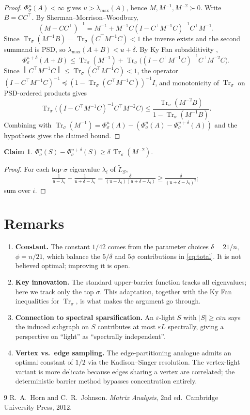 \documentclass[11pt]{article}
\newcommand{\eps}{\varepsilon}
\newcommand{\Trs}{\operatorname{Tr}_{\sigma}}
\newcommand{\opnorm}[1]{\left\lVert #1 \right\rVert}
\newcommand{\del}{\delta}
\newcommand{\tL}{\widetilde{L}}
\newtheorem{claim}[theorem]{Claim}
\begin{document}
\begin{proof}
$\Phi^u_\sigma(A)<\infty$ gives $u>\lambda_{\max}(A)$, hence
$M,M^{-1},M^{-2}\succ 0$. Write $B=CC^{\!\top}$. By Sherman--Morrison--Woodbury,
\[
  (M-CC^{\!\top})^{-1}
   = M^{-1} + M^{-1}C(I-C^{\!\top}M^{-1}C)^{-1}C^{\!\top}M^{-1}.
\]
Since $\Trs(M^{-1}B)=\Trs(C^{\!\top}M^{-1}C)<1$ the inverse exists and the
second summand is PSD, so $\lambda_{\max}(A+B)<u+\del$. By Ky Fan
subadditivity \cite[Thm.~4.3.47a]{HJ12},
\[
  \Phi^{u+\del}_\sigma(A+B)
   \le \Trs(M^{-1})
       + \Trs\!\bigl((I-C^{\!\top}M^{-1}C)^{-1}C^{\!\top}M^{-2}C\bigr).
\]
Since $\opnorm{C^{\!\top}M^{-1}C}\le\Trs(C^{\!\top}M^{-1}C)<1$, the operator
$(I-C^{\!\top}M^{-1}C)^{-1}\preceq(1-\Trs(C^{\!\top}M^{-1}C))^{-1}I$, and
monotonicity of $\Trs$ on PSD-ordered products gives
\[
  \Trs\!\bigl((I-C^{\!\top}M^{-1}C)^{-1}C^{\!\top}M^{-2}C\bigr)
   \le \frac{\Trs(M^{-2}B)}{1-\Trs(M^{-1}B)}.
\]
Combining with
$\Trs(M^{-1})=\Phi^u_\sigma(A)-(\Phi^u_\sigma(A)-\Phi^{u+\del}_\sigma(A))$
and the hypothesis gives the claimed bound.
\end{proof}

\begin{claim}\label{cl:phi-diff}
$\Phi^u_\sigma(S)-\Phi^{u+\del}_\sigma(S)\ge\del\,\Trs(M^{-2})$.
\end{claim}
\begin{proof}
For each top-$\sigma$ eigenvalue $\lambda_i$ of $\tL_S$,
\[
  \tfrac{1}{u-\lambda_i}-\tfrac{1}{u+\del-\lambda_i}
   = \tfrac{\del}{(u-\lambda_i)(u+\del-\lambda_i)}
   \ge \tfrac{\del}{(u+\del-\lambda_i)^2};
\]
sum over $i$.
\end{proof}

\section*{Remarks}

\begin{enumerate}\setlength\itemsep{4pt}
\item \textbf{Constant.} The constant $1/42$ comes from the parameter choices
$\del=21/n$, $\phi=n/21$, which balance the $5/\del$ and $5\phi$ contributions
in \eqref{eq:total}. It is not believed optimal; improving it is open.
\item \textbf{Key innovation.} The standard upper-barrier function tracks all
eigenvalues; here we track only the top $\sigma$. This adaptation, together
with the Ky Fan inequalities for $\Trs$, is what makes the argument go
through.
\item \textbf{Connection to spectral sparsification.} An $\eps$-light $S$ with
$|S|\ge c\eps n$ says the induced subgraph on $S$ contributes at most $\eps L$
spectrally, giving a perspective on ``light'' as ``spectrally independent''.
\item \textbf{Vertex vs.\ edge sampling.} The edge-partitioning analogue
admits an optimal constant of $1/2$ via the Kadison--Singer resolution. The
vertex-light variant is more delicate because edges sharing a vertex are
correlated; the deterministic barrier method bypasses concentration entirely.
\end{enumerate}

\begin{thebibliography}{9}
 R.~A.~Horn and C.~R.~Johnson.
  \emph{Matrix Analysis}, 2nd ed.\ Cambridge University Press, 2012.
\end{thebibliography}
\end{document}
